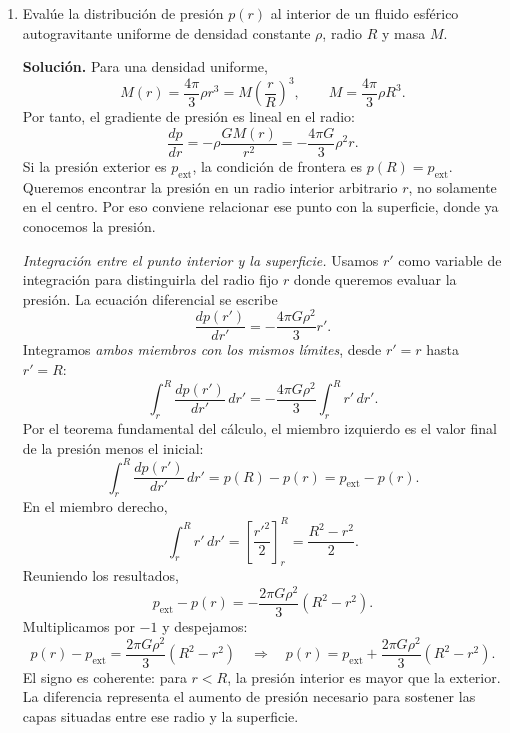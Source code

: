 \begin{enumerate}
\item Evalúe la distribución de presión $p(r)$ al interior de un fluido esférico autogravitante uniforme de densidad constante $\rho$, radio $R$ y masa $M$.

\textbf{Solución.} Para una densidad uniforme,
$$
M(r)=\frac{4\pi}{3}\rho r^3
=M\left(\frac{r}{R}\right)^3,
\qquad M=\frac{4\pi}{3}\rho R^3.
$$
Por tanto, el gradiente de presión es lineal en el radio:
$$
\frac{dp}{dr}=-\rho\frac{GM(r)}{r^2}
=-\frac{4\pi G}{3}\rho^2r.
$$
Si la presión exterior es $p_{\mathrm{ext}}$, la condición de frontera es $p(R)=p_{\mathrm{ext}}$. Queremos encontrar la presión en un radio interior arbitrario $r$, no solamente en el centro. Por eso conviene relacionar ese punto con la superficie, donde ya conocemos la presión.

\textit{Integración entre el punto interior y la superficie.} Usamos $r'$ como variable de integración para distinguirla del radio fijo $r$ donde queremos evaluar la presión. La ecuación diferencial se escribe
$$
\frac{dp(r')}{dr'}=-\frac{4\pi G\rho^2}{3}r'.
$$
Integramos \emph{ambos miembros con los mismos límites}, desde $r'=r$ hasta $r'=R$:
$$
\int_r^R\frac{dp(r')}{dr'}\,dr'
=-\frac{4\pi G\rho^2}{3}\int_r^R r'\,dr'.
$$
Por el teorema fundamental del cálculo, el miembro izquierdo es el valor final de la presión menos el inicial:
$$
\int_r^R\frac{dp(r')}{dr'}\,dr'
=p(R)-p(r)=p_{\mathrm{ext}}-p(r).
$$
En el miembro derecho,
$$
\int_r^R r'\,dr'
=\left[\frac{r'^2}{2}\right]_r^R
=\frac{R^2-r^2}{2}.
$$
Reuniendo los resultados,
$$
p_{\mathrm{ext}}-p(r)
=-\frac{2\pi G\rho^2}{3}(R^2-r^2).
$$
Multiplicamos por $-1$ y despejamos:
$$
p(r)-p_{\mathrm{ext}}
=\frac{2\pi G\rho^2}{3}(R^2-r^2)
\quad\Longrightarrow\quad
\boxed{p(r)=p_{\mathrm{ext}}+\frac{2\pi G\rho^2}{3}(R^2-r^2)}.
$$
El signo es coherente: para $r<R$, la presión interior es mayor que la exterior. La diferencia representa el aumento de presión necesario para sostener las capas situadas entre ese radio y la superficie.


\end{enumerate}
